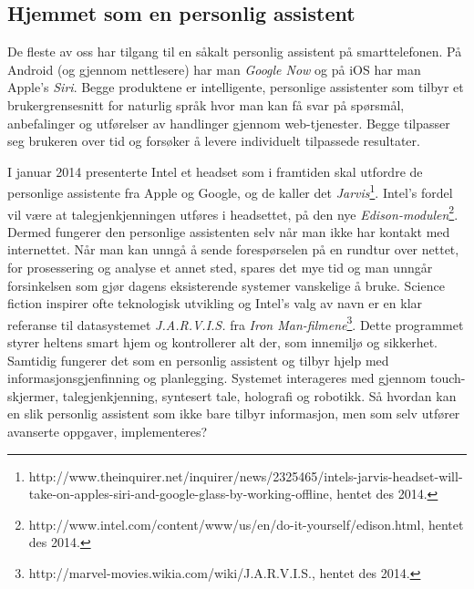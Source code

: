 {\subsection*{Hjemmet som en personlig assistent}
De fleste av oss har tilgang til en såkalt personlig assistent på smarttelefonen. På Android (og gjennom nettlesere) har man \emph{Google Now} og på iOS har man Apple's \emph{Siri}. Begge produktene er intelligente, personlige assistenter som tilbyr et brukergrensesnitt for naturlig språk hvor man kan få svar på spørsmål, anbefalinger og utførelser av handlinger gjennom web-tjenester. Begge tilpasser seg brukeren over tid og forsøker å levere individuelt tilpassede resultater.

I januar 2014 presenterte Intel et headset som i framtiden skal utfordre de personlige assistente fra Apple og Google, og de kaller det \emph{Jarvis}\footnote{http://www.theinquirer.net/inquirer/news/2325465/intels-jarvis-headset-will-take-on-apples-siri-and-google-glass-by-working-offline, hentet des 2014.}. Intel's fordel vil være at talegjenkjenningen utføres i headsettet, på den nye \emph{Edison-modulen}\footnote{http://www.intel.com/content/www/us/en/do-it-yourself/edison.html, hentet des 2014.}. Dermed fungerer den personlige assistenten selv når man ikke har kontakt med internettet. Når man kan unngå å sende forespørselen på en rundtur over nettet, for prosessering og analyse et annet sted, spares det mye tid og man unngår forsinkelsen som gjør dagens eksisterende systemer vanskelige å bruke. Science fiction inspirer ofte teknologisk utvikling og Intel's valg av navn er en klar referanse til datasystemet \emph{J.A.R.V.I.S.} fra \emph{Iron Man-filmene}\footnote{http://marvel-movies.wikia.com/wiki/J.A.R.V.I.S., hentet des 2014.}. Dette programmet styrer heltens smart hjem og kontrollerer alt der, som innemiljø og sikkerhet. Samtidig fungerer det som en personlig assistent og tilbyr hjelp med informasjonsgjenfinning og planlegging. Systemet interageres med gjennom touch-skjermer, talegjenkjenning, syntesert tale, holografi og robotikk. Så hvordan kan en slik personlig assistent som ikke bare tilbyr informasjon, men som selv utfører avanserte oppgaver, implementeres?

}
